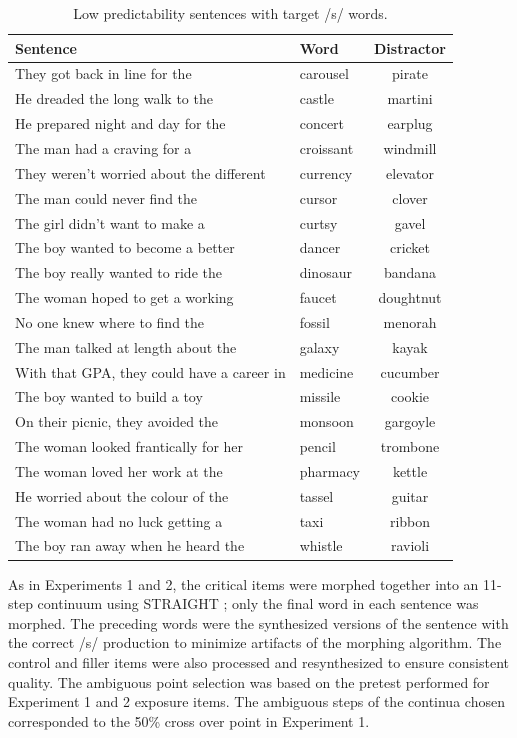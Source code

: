 \begin{table}[!ht]
\caption{Low predictability sentences with target /s/ words.}
\label{tbl:sentlows}
\small
\centering
\begin{tabular}{llc}
\toprule
Sentence                                                                     & Word        & Distractor  \\
\midrule
They got back in line for the & carousel & pirate \\
He dreaded the long walk to the & castle & martini \\
He prepared night and day for the & concert & earplug \\
The man had a craving for a & croissant & windmill \\
They weren't worried about the different & currency & elevator \\
The man could never find the & cursor & clover \\
The girl didn't want to make a & curtsy & gavel \\
The boy wanted to become a better & dancer & cricket \\
The boy really wanted to ride the & dinosaur & bandana \\
The woman hoped to get a working & faucet & doughtnut \\
No one knew where to find the & fossil & menorah \\
The man talked at length about the & galaxy & kayak \\
With that GPA, they could have a career in & medicine & cucumber \\
The boy wanted to build a toy & missile & cookie \\
On their picnic, they avoided the & monsoon & gargoyle \\
The woman looked frantically for her & pencil & trombone \\
The woman loved her work at the & pharmacy & kettle \\
He worried about the colour of the & tassel & guitar \\
The woman had no luck getting a & taxi & ribbon \\
The boy ran away when he heard the & whistle & ravioli \\
\bottomrule
\end{tabular}
\end{table}

As in Experiments 1 and 2, the critical items were morphed together into an 11-step continuum using STRAIGHT \citep{Kawahara2008}; only the final word in each sentence was morphed. 
The preceding words were the synthesized versions of the sentence with the correct /s/ production to minimize artifacts of the morphing algorithm.  
The control and filler items were also processed and resynthesized to ensure consistent quality.  
The ambiguous point selection was based on the pretest performed for Experiment 1 and 2 exposure items.  
The ambiguous steps of the continua chosen corresponded to the 50\% cross over point in Experiment 1.

